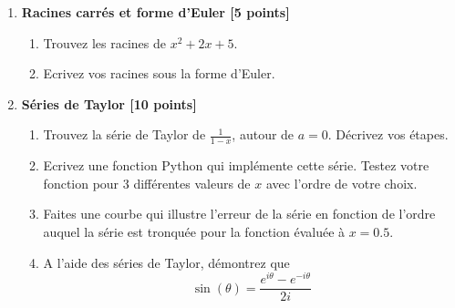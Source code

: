 \documentclass{article}
\begin{document}
\vspace{1cm}
\begin{enumerate}

\item {\bf Racines carrés et forme d'Euler [5 points]}
  \begin{enumerate}
    \item Trouvez les racines de $x^2 + 2x + 5$.

    \item Ecrivez vos racines sous la forme d'Euler.

    \end{enumerate}
\vspace{1cm}
\item {\bf Séries de Taylor [10 points]}
  \begin{enumerate}
    \item Trouvez la série de Taylor de $\displaystyle \frac{1}{1 -
    x}$, autour de $a = 0$. Décrivez vos étapes.


    \item Ecrivez une fonction Python qui implémente cette
      série. Testez votre fonction pour 3 différentes valeurs de $x$
      avec l'ordre de votre choix. 

    \item Faites une courbe qui illustre l'erreur de la série en
      fonction de l'ordre auquel la série est tronquée pour la
      fonction évaluée à $x = 0.5$. 

    \item A l'aide des séries de Taylor, démontrez que 
       $$
       \sin(\theta) = \frac{e^{i\theta} - e^{-i\theta}}{2i}
       $$      
      
      
  \end{enumerate}
  

\end{enumerate}
\end{document}
